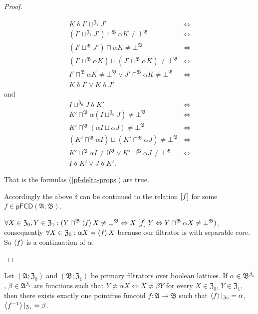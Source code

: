 \begin{proof}
\begin{widedisorder}
\begin{align*}
K\mathrel{\delta}I'\sqcup^{\mathfrak{Z}_{1}}J' & \Leftrightarrow\\
(I'\sqcup^{\mathfrak{Z}_{1}}J')\sqcap^{\mathfrak{B}}\alpha K\neq\bot^{\mathfrak{B}} & \Leftrightarrow\\
(I'\sqcup^{\mathfrak{B}}J')\sqcap\alpha K\neq\bot^{\mathfrak{B}} & \Leftrightarrow\\
(I'\sqcap^{\mathfrak{B}}\alpha K)\sqcup(J'\sqcap^{\mathfrak{B}}\alpha K)\neq\bot^{\mathfrak{B}} & \Leftrightarrow\\
I'\sqcap^{\mathfrak{B}}\alpha K\neq\bot^{\mathfrak{B}}\vee J'\sqcap^{\mathfrak{B}}\alpha K\neq\bot^{\mathfrak{B}} & \Leftrightarrow\\
K\mathrel{\delta}I'\vee K\mathrel{\delta}J'
\end{align*}
and
\begin{align*}
I\sqcup^{\mathfrak{Z}_{0}}J\mathrel{\delta}K' & \Leftrightarrow\\
K'\sqcap^{\mathfrak{B}}\alpha(I\sqcup^{\mathfrak{Z}_{0}}J)\neq\bot^{\mathfrak{B}} & \Leftrightarrow\\
K'\sqcap^{\mathfrak{B}}(\alpha I\sqcup\alpha J)\neq\bot^{\mathfrak{B}} & \Leftrightarrow\\
(K'\sqcap^{\mathfrak{B}}\alpha I)\sqcup(K'\sqcap^{\mathfrak{B}}\alpha J)\neq\bot^{\mathfrak{B}} & \Leftrightarrow\\
K'\sqcap^{\mathfrak{B}}\alpha I\neq0^{\mathfrak{B}}\vee K'\sqcap^{\mathfrak{B}}\alpha J\neq\bot^{\mathfrak{B}} & \Leftrightarrow\\
I\mathrel{\delta}K'\vee J\mathrel{\delta}K'.
\end{align*}



That is the formulas (\ref{pf-delta-props}) are true.


Accordingly the above $\delta$ can be continued to the relation $\mathrel{\left[f\right]}$
for some $f\in\mathsf{pFCD}(\mathfrak{A};\mathfrak{B})$.


$\forall X\in\mathfrak{Z}_{0},Y\in\mathfrak{Z}_{1}:(Y\sqcap^{\mathfrak{B}}\left\langle f\right\rangle X\neq\bot^{\mathfrak{B}}\Leftrightarrow X\mathrel{\left[f\right]}Y\Leftrightarrow Y\sqcap^{\mathfrak{B}}\alpha X\neq\bot^{\mathfrak{B}})$,
consequently $\forall X\in\mathfrak{Z}_{0}:\alpha X=\left\langle f\right\rangle X$ because
our filtrator is with separable core. So $\left\langle f\right\rangle$ is a continuation
of $\alpha$.

\end{widedisorder}
\end{proof}
\begin{thm}
Let $(\mathfrak{A};\mathfrak{Z}_{0})$ and $(\mathfrak{B};\mathfrak{Z}_{1})$
be primary filtrators over boolean lattices. If $\alpha\in\mathfrak{B}^{\mathfrak{Z}_{0}}$,
$\beta\in\mathfrak{A}^{\mathfrak{Z}_{1}}$ are functions such that
$Y\nasymp\alpha X\Leftrightarrow X\nasymp\beta Y$ for every $X\in\mathfrak{Z}_{0}$,
$Y\in\mathfrak{Z}_{1}$, then there exists exactly one pointfree funcoid $f:\mathfrak{A}\rightarrow\mathfrak{B}$
such that $\left\langle f\right\rangle|_{\mathfrak{Z}_0}=\alpha$, $\left\langle f^{-1}\right\rangle|_{\mathfrak{Z}_1}=\beta$.\end{thm}
